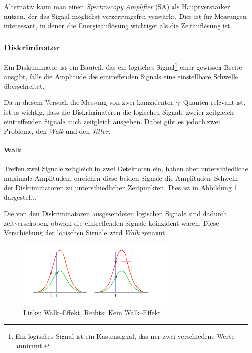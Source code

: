 \documentclass[12pt,a4paper]{scrartcl}
\numberwithin{equation}{section} %
\begin{document}
Alternativ kann man einen \emph{Spectroscopy Amplifier} (SA) als Hauptverstärker nutzen, der das Signal möglichst verzerrungsfrei verstärkt. Dies ist für Messungen interessant, in denen die Energieauflösung wichtiger als die Zeitauflösung ist.

\hypertarget{diskriminator}{%
\subsubsection{Diskriminator}\label{diskriminator}}

Ein Diskriminator ist ein Bauteil, das ein logisches Signal\footnote{Ein logisches Signal ist ein Kastensignal, das nur zwei verschiedene Werte annimmt.} einer gewissen Breite ausgibt, falls die Amplitude des eintreffenden Signals eine einstellbare Schwelle überschreitet.

Da in diesem Versuch die Messung von zwei koinzidenten $\gamma$--Quanten relevant ist, ist es wichtig, dass die Diskriminatoren die logischen Signale zweier zeitgleich eintreffenden Signale auch zeitgleich ausgeben. Dabei gibt es jedoch zwei Probleme, den \emph{Walk} und den \emph{Jitter}.

\paragraph{Walk}
Treffen zwei Signale zeitgleich in zwei Detektoren ein, haben aber unterschiedliche maximale Amplituden, erreichen diese beiden Signale die Amplituden--Schwelle der Diskriminatoren zu unterschiedlichen Zeitpunkten. Dies ist in Abbildung \ref{abb:Walk-Effekt} dargestellt.

Die von den Diskriminatoren ausgesendeten logischen Signale sind dadurch zeitverschoben, obwohl die eintreffenden Signale koinzident waren. Diese Verschiebung der logischen Signale wird \emph{Walk} genannt.

\begin{figure}[h]
	\centering
	\includegraphics[width=0.7\textwidth]{../media/B3.4/Constant_fraction_1.pdf}
	\caption{Links: Walk--Effekt, Rechts: Kein Walk--Effekt \cite{abb:Constant_fraction}}
	\label{abb:Walk-Effekt}
\end{figure}
\end{document}
